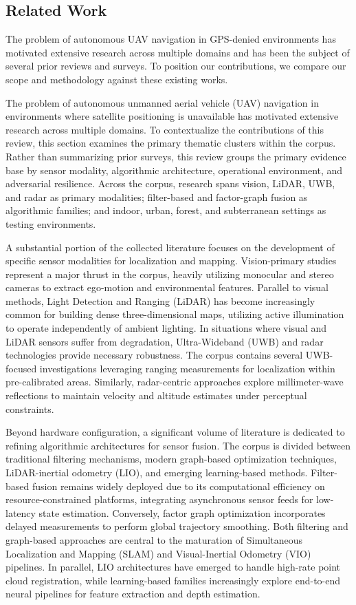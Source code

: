 \documentclass[conference]{IEEEtran}
\begin{document}
\subsection{Related Work}


The problem of autonomous UAV navigation in GPS-denied environments has motivated extensive research across multiple domains and has been the subject of several prior reviews and surveys. To position our contributions, we compare our scope and methodology against these existing works.


The problem of autonomous unmanned aerial vehicle (UAV) navigation in environments where satellite positioning is unavailable has motivated extensive research across multiple domains. To contextualize the contributions of this review, this section examines the primary thematic clusters within the corpus. Rather than summarizing prior surveys, this review groups the primary evidence base by sensor modality, algorithmic architecture, operational environment, and adversarial resilience. Across the corpus, research spans vision, LiDAR, UWB, and radar as primary modalities; filter-based and factor-graph fusion as algorithmic families; and indoor, urban, forest, and subterranean settings as testing environments.


A substantial portion of the collected literature focuses on the development of specific sensor modalities for localization and mapping. Vision-primary studies represent a major thrust in the corpus, heavily utilizing monocular and stereo cameras to extract ego-motion and environmental features. Parallel to visual methods, Light Detection and Ranging (LiDAR) has become increasingly common for building dense three-dimensional maps, utilizing active illumination to operate independently of ambient lighting. In situations where visual and LiDAR sensors suffer from degradation, Ultra-Wideband (UWB) and radar technologies provide necessary robustness. The corpus contains several UWB-focused investigations leveraging ranging measurements for localization within pre-calibrated areas. Similarly, radar-centric approaches explore millimeter-wave reflections to maintain velocity and altitude estimates under perceptual constraints. 


Beyond hardware configuration, a significant volume of literature is dedicated to refining algorithmic architectures for sensor fusion. The corpus is divided between traditional filtering mechanisms, modern graph-based optimization techniques, LiDAR-inertial odometry (LIO), and emerging learning-based methods. Filter-based fusion remains widely deployed due to its computational efficiency on resource-constrained platforms, integrating asynchronous sensor feeds for low-latency state estimation. Conversely, factor graph optimization incorporates delayed measurements to perform global trajectory smoothing. Both filtering and graph-based approaches are central to the maturation of Simultaneous Localization and Mapping (SLAM) and Visual-Inertial Odometry (VIO) pipelines. In parallel, LIO architectures have emerged to handle high-rate point cloud registration, while learning-based families increasingly explore end-to-end neural pipelines for feature extraction and depth estimation.
\end{document}
